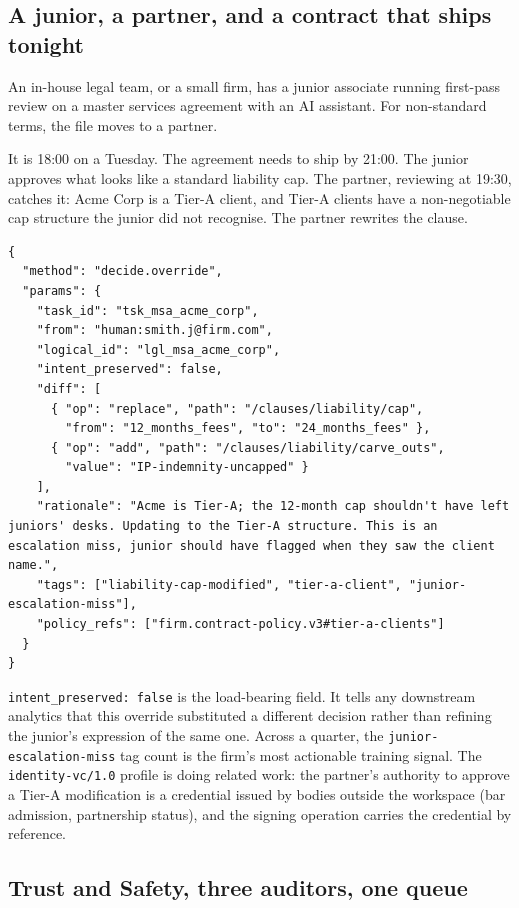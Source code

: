 \documentclass[11pt]{article}
\begin{document}
\subsection{A junior, a partner, and a contract that ships tonight}

An in-house legal team, or a small firm, has a junior associate running first-pass review on a master services agreement with an AI assistant. For non-standard terms, the file moves to a partner.

It is 18:00 on a Tuesday. The agreement needs to ship by 21:00. The junior approves what looks like a standard liability cap. The partner, reviewing at 19:30, catches it: Acme Corp is a Tier-A client, and Tier-A clients have a non-negotiable cap structure the junior did not recognise. The partner rewrites the clause.

\begin{lstlisting}[caption={Override that substitutes a different decision.},label={lst:case6-override}]
{
  "method": "decide.override",
  "params": {
    "task_id": "tsk_msa_acme_corp",
    "from": "human:smith.j@firm.com",
    "logical_id": "lgl_msa_acme_corp",
    "intent_preserved": false,
    "diff": [
      { "op": "replace", "path": "/clauses/liability/cap",
        "from": "12_months_fees", "to": "24_months_fees" },
      { "op": "add", "path": "/clauses/liability/carve_outs",
        "value": "IP-indemnity-uncapped" }
    ],
    "rationale": "Acme is Tier-A; the 12-month cap shouldn't have left juniors' desks. Updating to the Tier-A structure. This is an escalation miss, junior should have flagged when they saw the client name.",
    "tags": ["liability-cap-modified", "tier-a-client", "junior-escalation-miss"],
    "policy_refs": ["firm.contract-policy.v3#tier-a-clients"]
  }
}
\end{lstlisting}

\texttt{intent\_preserved: false} is the load-bearing field. It tells any downstream analytics that this override substituted a different decision rather than refining the junior's expression of the same one. Across a quarter, the \texttt{junior-escalation-miss} tag count is the firm's most actionable training signal. The \texttt{identity-vc/1.0} profile is doing related work: the partner's authority to approve a Tier-A modification is a credential issued by bodies outside the workspace (bar admission, partnership status), and the signing operation carries the credential by reference.

\subsection{Trust and Safety, three auditors, one queue}
\end{document}
